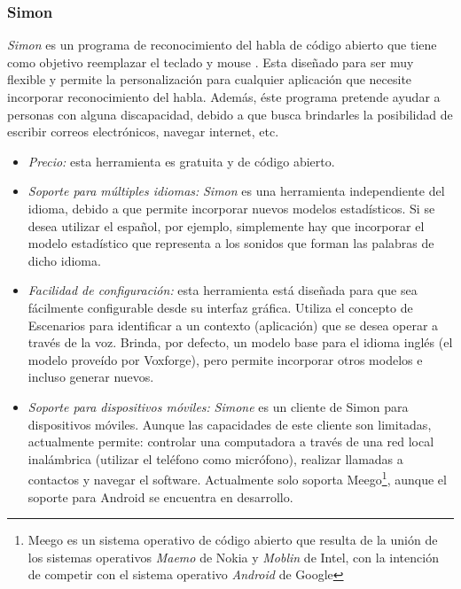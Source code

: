 \subsubsection{Simon}
\label{sec:simon}

\emph{Simon} es un programa de reconocimiento del habla de c\'odigo abierto que tiene como objetivo
reemplazar el teclado y mouse \cite{SimonListen}. Esta dise\~nado para ser muy flexible y permite la
personalizaci\'on para cualquier aplicaci\'on que necesite incorporar reconocimiento
del habla. Adem\'as, \'este programa pretende ayudar a personas con alguna discapacidad, debido
a que busca brindarles la posibilidad de escribir correos electr\'onicos, navegar internet, etc.

\begin{itemize}
    \item \emph{Precio:} esta herramienta es gratuita y de c\'odigo abierto.
    \item \emph{Soporte para m\'ultiples idiomas:} \emph{Simon} es una herramienta independiente del idioma,
    debido a que permite incorporar nuevos modelos estad\'isticos. Si se desea
	utilizar el espa\~nol, por ejemplo, simplemente hay que incorporar el modelo estad\'istico que representa
    a los sonidos que forman las palabras de dicho idioma.
    \item \emph{Facilidad de configuraci\'on:} esta herramienta est\'a dise\~nada para que sea
	f\'acilmente configurable desde su interfaz gr\'afica. Utiliza el concepto de Escenarios para identificar a un contexto (aplicaci\'on)
	que se desea operar a trav\'es de la voz. Brinda, por defecto, un modelo base para el idioma ingl\'es (el
    modelo prove\'ido por Voxforge\cite{Voxforge}), pero permite incorporar otros modelos e incluso generar nuevos.
    \item \emph{Soporte para dispositivos m\'oviles:} \emph{Simone} es un cliente de Simon para dispositivos m\'oviles. Aunque las
	capacidades de este cliente son limitadas, actualmente permite: controlar una computadora a trav\'es de una red
	local inal\'ambrica (utilizar el tel\'efono como micr\'ofono), realizar llamadas a contactos y navegar el software. Actualmente
	solo soporta Meego\footnote{Meego es un sistema operativo de c\'odigo abierto que resulta de la uni\'on de
	los sistemas operativos \emph{Maemo} de Nokia y \emph{Moblin} de Intel, con la intenci\'on de competir
	con el sistema operativo \emph{Android} de Google}, aunque el soporte para Android se encuentra en desarrollo.

\end{itemize}
